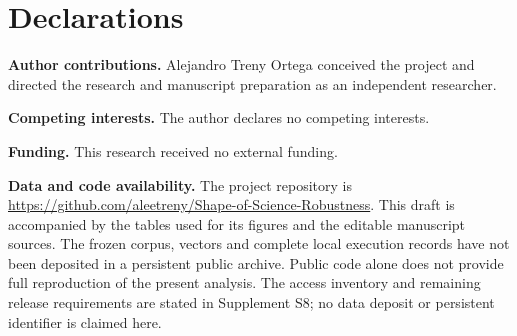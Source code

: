 \documentclass[12pt]{article}
\begin{document}
\section*{Declarations}
\textbf{Author contributions.}
Alejandro Treny Ortega conceived the project and directed the research and manuscript preparation as an independent researcher.
\par\medskip
\textbf{Competing interests.}
The author declares no competing interests.
\par\medskip
\textbf{Funding.}
This research received no external funding.
\par\medskip
\textbf{Data and code availability.}
The project repository is \url{https://github.com/aleetreny/Shape-of-Science-Robustness}. This draft is accompanied by the tables used for its figures and the editable manuscript sources. The frozen corpus, vectors and complete local execution records have not been deposited in a persistent public archive. Public code alone does not provide full reproduction of the present analysis. The access inventory and remaining release requirements are stated in Supplement S8; no data deposit or persistent identifier is claimed here.


\begingroup
{}


\endgroup
\end{document}
